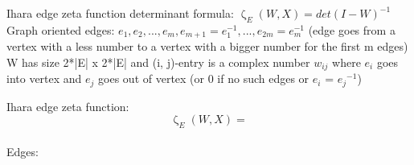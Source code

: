 \documentclass[12pt]{extarticle}
\begin{document}
Ihara edge zeta function determinant formula: $\upzeta_E(W, X) = det(I-W)^{-1}$\\
Graph oriented edges: $e_{1}, e_{2}, ... , e_{m}, e_{m+1}=e_{1}^{-1}, ... , e_{2m}=e_{m}^{-1}$ (edge goes from a vertex with a less number to a vertex with a bigger number for the first m edges) \\
W has size 2*|E| x 2*|E| and (i, j)-entry is a complex number $w_{ij}$ where $e_{i}$ goes into vertex and $e_{j}$ goes out of vertex (or 0 if no such edges or $e_{i}$ = ${e_j}^{-1}$)

\bigskip
Ihara edge zeta function: $$\upzeta_E(W, X) = $$ \\

Edges:
\end{document}
